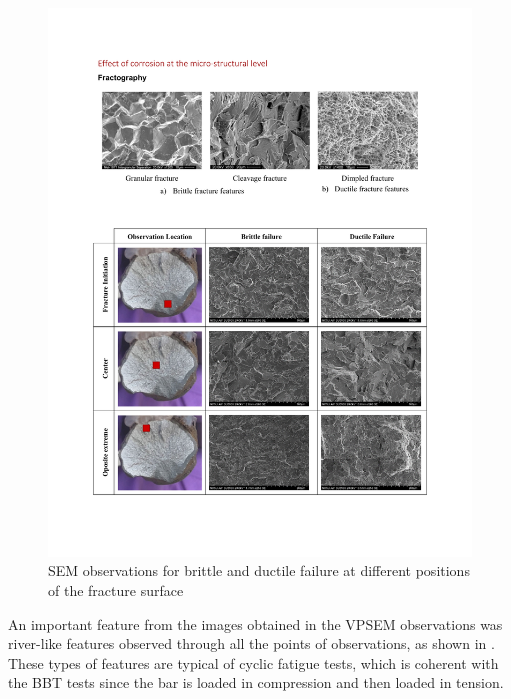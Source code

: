 \begin{figure}[htbp]
	\centering
	\includegraphics[width=1\textwidth]{VAC Thesis 2.0/Chapter-4/figs/BBT_fractography.pdf}
	\caption{SEM observations for brittle and ductile failure at different positions of the fracture surface}
	\label{fig:FractureSurfaces}
\end{figure}

An important feature from the images obtained in the VPSEM observations was river-like features observed through all the points of observations, as shown in . These types of features are typical of cyclic fatigue tests, which is coherent with the BBT tests since the bar is loaded in compression and then loaded in tension.

